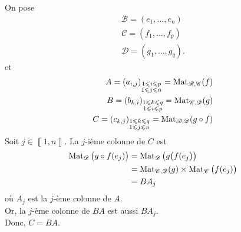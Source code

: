 \begin{prv}
	On pose
	\begin{align*}
		\mathcal{B} = (e_1, \ldots, e_n)\\
		\mathcal{C} = (f_1, \ldots, f_p)\\
		\mathcal{D} = (g_1, \ldots, g_q).
	\end{align*}
	et
	\begin{align*}
		A = (a_{i,j})_{\substack{1\leqslant i\leqslant p\\1\leqslant j\leqslant n}} = \operatorname{Mat}_{\mathcal{B},\mathcal{C}}(f)\\
		B = (b_{k,i})_{\substack{1\leqslant k\leqslant q\\1\leqslant i\leqslant p}} = \operatorname{Mat}_{\mathcal{C},\mathcal{D}}(g)\\
		C = (c_{k,j})_{\substack{1\leqslant k\leqslant q\\1\leqslant j\leqslant n}} = \operatorname{Mat}_{\mathcal{B},\mathcal{D}}(g \circ f)\\
	\end{align*}
	Soit $j \in \left\llbracket 1,n \right\rrbracket$. La $j$-ième colonne de $C$ est
	\begin{align*}
		\operatorname{Mat}_{\mathcal{D}}\big(g \circ f(e_j)\big) &= \operatorname{Mat}_{\mathcal{D}}\big(g\big(f(e_j\big)\big) \\
		&= \operatorname{Mat}_{\mathcal{C},\mathcal{D}}(g) \times \operatorname{Mat}_{\mathcal{C}}\big(f(e_j)\big) \\
		&= B A_j \\
	\end{align*} où $A_j$ est la $j$-ème colonne de $A$.\\
	Or, la $j$-ème colonne de $BA$ est aussi $BA_j$.\\
	Donc, $C = BA$.
\end{prv}
